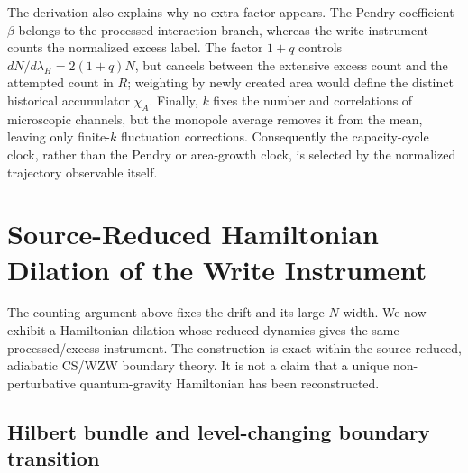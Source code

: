 \documentclass[aps,prd,twocolumn,10pt,superscriptaddress,nofootinbib]{revtex4-2}
\begin{document}
The derivation also explains why no extra factor appears.  The Pendry
coefficient $\beta$ belongs to the processed interaction branch, whereas the
write instrument counts the normalized excess label.  The factor $1+q$
controls $dN/d\lambda_H=2(1+q)N$, but cancels between the extensive excess
count and the attempted count in $\overline R$; weighting by newly created
area would define the distinct historical accumulator $\chi_A$.  Finally,
$k$ fixes the number and correlations of microscopic channels, but the
monopole average removes it from the mean, leaving only finite-$k$
fluctuation corrections.  Consequently the capacity-cycle clock, rather
than the Pendry or area-growth clock, is selected by the normalized
trajectory observable itself.




\section{Source-Reduced Hamiltonian Dilation of the Write Instrument}
\label{sec:exact_hamiltonian_dilation}

The counting argument above fixes the drift and its large-$N$ width.  We now
exhibit a Hamiltonian dilation whose reduced dynamics gives the same
processed/excess instrument.  The construction is exact within the
source-reduced, adiabatic CS/WZW boundary theory.  It is not a claim that a
unique non-perturbative quantum-gravity Hamiltonian has been reconstructed.

\subsection{Hilbert bundle and level-changing boundary transition}
\end{document}
